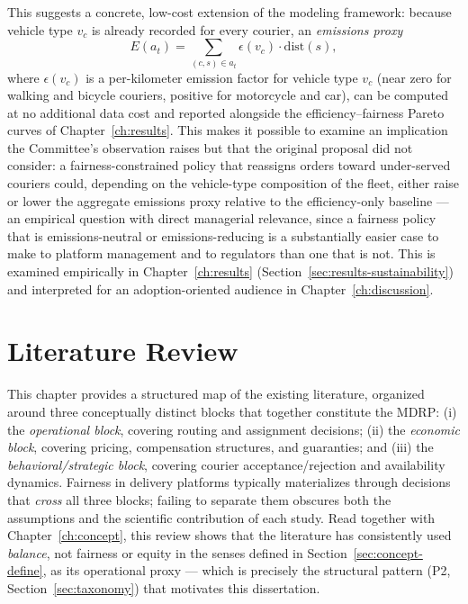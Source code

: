 \documentclass[12pt,a4paper]{report}
\begin{document}
This suggests a concrete, low-cost extension of the modeling framework: because vehicle type $v_c$ is already recorded for every courier, an \emph{emissions proxy}
\begin{equation}
    E(a_t) = \sum_{(c,s) \in a_t} \epsilon(v_c) \cdot \text{dist}(s),
    \label{eq:emissions}
\end{equation}
where $\epsilon(v_c)$ is a per-kilometer emission factor for vehicle type $v_c$ (near zero for walking and bicycle couriers, positive for motorcycle and car), can be computed at no additional data cost and reported alongside the efficiency--fairness Pareto curves of Chapter~\ref{ch:results}. This makes it possible to examine an implication the Committee's observation raises but that the original proposal did not consider: a fairness-constrained policy that reassigns orders toward under-served couriers could, depending on the vehicle-type composition of the fleet, either raise or lower the aggregate emissions proxy relative to the efficiency-only baseline --- an empirical question with direct managerial relevance, since a fairness policy that is emissions-neutral or emissions-reducing is a substantially easier case to make to platform management and to regulators than one that is not. This is examined empirically in Chapter~\ref{ch:results} (Section~\ref{sec:results-sustainability}) and interpreted for an adoption-oriented audience in Chapter~\ref{ch:discussion}.

\chapter{Literature Review}
\label{ch:litreview}
\label{sec:literature}

This chapter provides a structured map of the existing literature, organized around three conceptually distinct blocks that together constitute the MDRP: (i) the \emph{operational block}, covering routing and assignment decisions; (ii) the \emph{economic block}, covering pricing, compensation structures, and guaranties; and (iii) the \emph{behavioral/strategic block}, covering courier acceptance/rejection and availability dynamics. Fairness in delivery platforms typically materializes through decisions that \emph{cross} all three blocks; failing to separate them obscures both the assumptions and the scientific contribution of each study. Read together with Chapter~\ref{ch:concept}, this review shows that the literature has consistently used \emph{balance}, not fairness or equity in the senses defined in Section~\ref{sec:concept-define}, as its operational proxy --- which is precisely the structural pattern (P2, Section~\ref{sec:taxonomy}) that motivates this dissertation.
\end{document}
